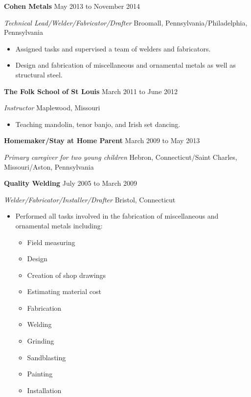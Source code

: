 \documentclass[9pt]{extarticle}
\begin{document}
\textbf{Cohen Metals} \hfill May 2013 to November 2014

\textit{Technical Lead/Welder/Fabricator/Drafter} \hfill Broomall, Pennsylvania/Philadelphia, Pennsylvania 

\begin{itemize}
    \item Assigned tasks and supervised a team of welders and fabricators.
    \item Design and fabrication of miscellaneous and ornamental metals as well as structural steel.
\end{itemize}

\textbf{The Folk School of St Louis} \hfill March 2011 to June 2012

\textit{Instructor} \hfill Maplewood, Missouri

\begin{itemize}
    \item Teaching mandolin, tenor banjo, and Irish set dancing.
\end{itemize}

\textbf{Homemaker/Stay at Home Parent} \hfill March 2009 to May 2013

\textit{Primary caregiver for two young children} \hfill Hebron, Connecticut/Saint Charles, Missouri/Aston, Pennsylvania

\newpage
\textbf{Quality Welding} \hfill July 2005 to March 2009

\textit{Welder/Fabricator/Installer/Drafter} \hfill Bristol, Connecticut

\begin{itemize}
    \item Performed all tasks involved in the fabrication of miscellaneous and ornamental metals including: 
        \begin{multicols}{3}
\begin{itemize}
    \item Field measuring 
    \item Design 
    \item Creation of shop drawings 
    \item Estimating material cost 
    \item Fabrication 
    \item Welding 
    \item Grinding 
    \item Sandblasting 
    \item Painting 
    \item Installation
\end{itemize}
\end{multicols}
\end{itemize}
\end{document}
